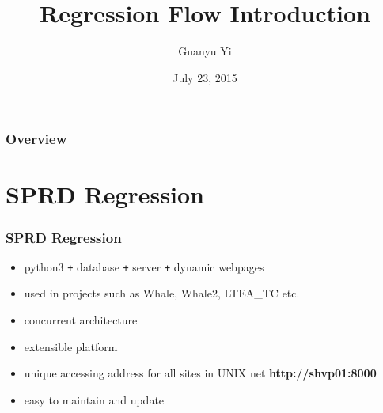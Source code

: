 \documentclass{beamer}
\title[Powered by Python]{Regression Flow Introduction} %
\author{Guanyu Yi} %
\institute[SPRD] %
{
  Spreadtrum Communications, Inc. \\ %
  \medskip
  \textit{guanyu.yi@spreadtrum.com} %
}
\date{July 23, 2015} %
\begin{document}
\begin{frame}
  \titlepage %
\end{frame}

\begin{frame}
  \frametitle{Overview} %
  \tableofcontents %
\end{frame}


\section{SPRD Regression} %

\begin{frame}
  \frametitle{SPRD Regression}
  \begin{itemize}
  \item python3 \texttt{+} database \texttt{+} server \texttt{+} dynamic webpages
  \item used in projects such as Whale, Whale2, LTEA\_TC etc.
  \item concurrent architecture
  \item extensible platform
  \item unique accessing address for all sites in UNIX net \textbf{http://shvp01:8000}
  \item easy to maintain and update
  \end{itemize}
\end{frame}

\end{document}
